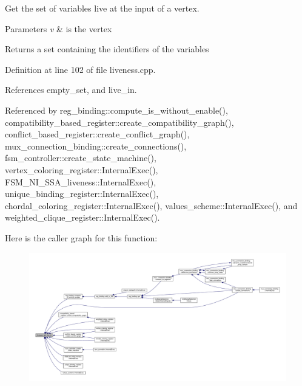 Get the set of variables live at the input of a vertex. 


\begin{DoxyParams}{Parameters}
{\em v} & is the vertex \\
\hline
\end{DoxyParams}
\begin{DoxyReturn}{Returns}
a set containing the identifiers of the variables 
\end{DoxyReturn}


Definition at line 102 of file liveness.\+cpp.



References empty\+\_\+set, and live\+\_\+in.



Referenced by reg\+\_\+binding\+::compute\+\_\+is\+\_\+without\+\_\+enable(), compatibility\+\_\+based\+\_\+register\+::create\+\_\+compatibility\+\_\+graph(), conflict\+\_\+based\+\_\+register\+::create\+\_\+conflict\+\_\+graph(), mux\+\_\+connection\+\_\+binding\+::create\+\_\+connections(), fsm\+\_\+controller\+::create\+\_\+state\+\_\+machine(), vertex\+\_\+coloring\+\_\+register\+::\+Internal\+Exec(), F\+S\+M\+\_\+\+N\+I\+\_\+\+S\+S\+A\+\_\+liveness\+::\+Internal\+Exec(), unique\+\_\+binding\+\_\+register\+::\+Internal\+Exec(), chordal\+\_\+coloring\+\_\+register\+::\+Internal\+Exec(), values\+\_\+scheme\+::\+Internal\+Exec(), and weighted\+\_\+clique\+\_\+register\+::\+Internal\+Exec().

Here is the caller graph for this function\+:
\nopagebreak
\begin{figure}[H]
\begin{center}
\leavevmode
\includegraphics[width=350pt]{d3/d1f/classliveness_a13fa885bb8a47eccb3483da6333665fd_icgraph}
\end{center}
\end{figure}
\mbox{\label{classliveness_a7d8d790a7cfe2d54832f8edcc3365407}} 
